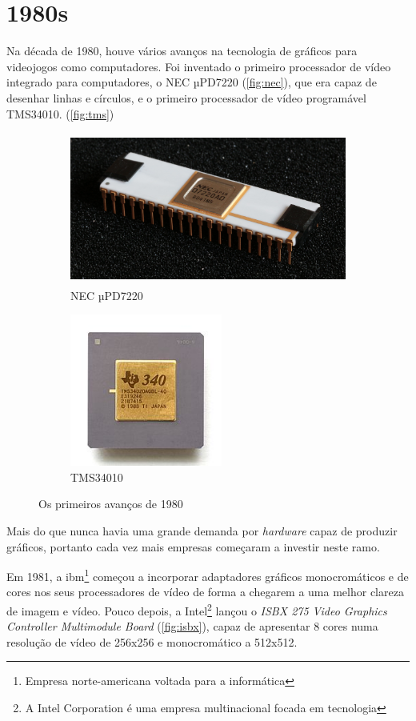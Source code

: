 \documentclass{report}
\begin{document}
\section{1980s}

Na década de 1980, houve vários avanços na tecnologia de gráficos para videojogos como computadores. Foi inventado o primeiro processador de vídeo integrado para computadores, o NEC µPD7220 (\autoref{fig:nec}), que era capaz de desenhar linhas e círculos, e o primeiro processador de vídeo programável TMS34010. (\autoref{fig:tms})


\begin{figure}[h]
\begin{subfigure}{0.5\textwidth}
\includegraphics[width=0.9\linewidth, height=5cm]{nec.jpg} 
\caption{NEC µPD7220}
\label{fig:nec}
\end{subfigure}
\begin{subfigure}{0.5\textwidth}
\includegraphics[width=0.9\linewidth, height=5cm]{tms.jpg}
\caption{TMS34010}
\label{fig:tms}
\end{subfigure}

\caption{Os primeiros avanços de 1980}
\label{fig:nectms}
\end{figure}

Mais do que nunca havia uma grande demanda por \textit{hardware} capaz de produzir gráficos, portanto cada vez mais empresas começaram a investir neste ramo.

Em 1981, a \ac{ibm}\footnote{Empresa norte-americana voltada para a informática} começou a incorporar adaptadores gráficos monocromáticos e de cores nos seus processadores de vídeo de forma a chegarem a uma melhor clareza de imagem e vídeo.
\clearpage
Pouco depois, a Intel\footnote{A Intel Corporation é uma empresa multinacional focada em tecnologia} lançou o \textit{ISBX 275 Video Graphics Controller Multimodule Board} (\autoref{fig:isbx}), capaz de apresentar 8 cores numa resolução de vídeo de 256x256 e monocromático a 512x512.
\end{document}

